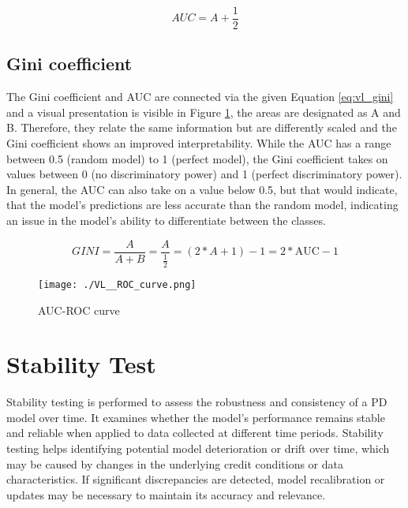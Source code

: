 \begin{equation}
AUC = A + \frac{1}{2} \label{eq:vl_auc}
\end{equation}

\subsection{Gini coefficient}
\label{sec:gini}
The Gini coefficient and \ac{AUC} are connected via the given Equation \ref{eq:vl_gini} and a visual presentation is visible in Figure \ref{fig:vl_roccurve}, the areas are designated as A and B. Therefore, they relate the same information but are differently scaled and the Gini coefficient shows an improved interpretability. While the \ac{AUC} has a range between 0.5 (random model) to 1 (perfect model), the Gini coefficient takes on values between 0 (no discriminatory power) and 1 (perfect discriminatory power). In general, the \ac{AUC} can also take on a value below 0.5, but that would indicate, that the model's predictions are less accurate than the random model, indicating an issue in the model's ability to differentiate between the classes. \cite{AUC:2023}

\begin{equation}
GINI = \frac{A}{A + B} = \frac{A}{\frac{1}{2}} = (2 * A + 1) - 1 = 2 * \text{AUC} - 1 \label{eq:vl_gini}
\end{equation}

\begin{figure}[H]
	\centering
	\texttt{[image: ./VL\_\_ROC\_curve.png]}
    \caption{AUC-ROC curve}
    \label{fig:vl_roccurve}
\end{figure}

\section{Stability Test}
Stability testing is performed to assess the robustness and consistency of a PD model over time. It examines whether the model's performance remains stable and reliable when applied to data collected at different time periods. Stability testing helps identifying potential model deterioration or drift over time, which may be caused by changes in the underlying credit conditions or data characteristics. If significant discrepancies are detected, model recalibration or updates may be necessary to maintain its accuracy and relevance.